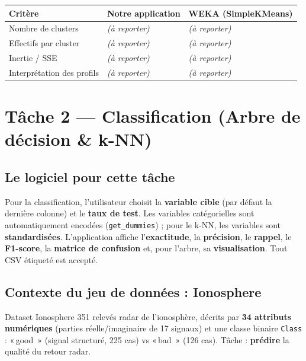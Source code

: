 \documentclass[11pt,a4paper]{article}
\providecommand{\og}{«\,}
\providecommand{\fg}{\,»}
\begin{document}
\begin{center}
\begin{tabular}{@{}p{4.2cm}p{4.3cm}p{4.3cm}@{}}
\toprule
\textbf{Critère} & \textbf{Notre application} & \textbf{WEKA (SimpleKMeans)} \\
\midrule
Nombre de clusters & \textit{(à reporter)} & \textit{(à reporter)} \\
Effectifs par cluster & \textit{(à reporter)} & \textit{(à reporter)} \\
Inertie / SSE & \textit{(à reporter)} & \textit{(à reporter)} \\
Interprétation des profils & \textit{(à reporter)} & \textit{(à reporter)} \\
\bottomrule
\end{tabular}
\end{center}

\newpage
\section{Tâche 2 --- Classification (Arbre de décision \& k-NN)}

\subsection{Le logiciel pour cette tâche}

\begin{appbox}
Pour la classification, l'utilisateur choisit la \textbf{variable cible} (par
défaut la dernière colonne) et le \textbf{taux de test}. Les variables
catégorielles sont automatiquement encodées (\texttt{get\_dummies}) ; pour le
k-NN, les variables sont \textbf{standardisées}. L'application affiche
l'\textbf{exactitude}, la \textbf{précision}, le \textbf{rappel}, le
\textbf{F1-score}, la \textbf{matrice de confusion} et, pour l'arbre, sa
\textbf{visualisation}. Tout CSV étiqueté est accepté.
\end{appbox}

\subsection{Contexte du jeu de données : Ionosphere}

\begin{definition}{Dataset Ionosphere}
351 relevés radar de l'ionosphère, décrits par \textbf{34 attributs numériques}
(parties réelle/imaginaire de 17 signaux) et une classe binaire
\texttt{Class} : \og good \fg{} (signal structuré, 225 cas) vs \og bad \fg{}
(126 cas). Tâche : \textbf{prédire} la qualité du retour radar.
\end{definition}
\end{document}
